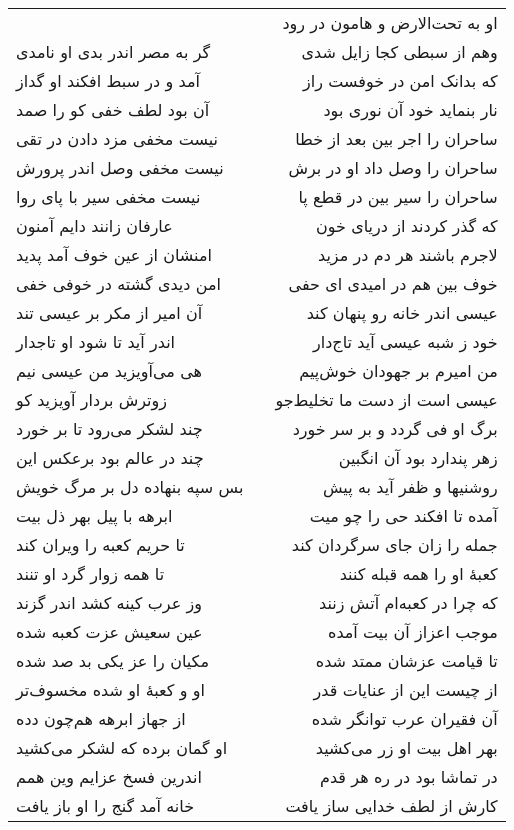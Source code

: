 \begin{center}
\begin{longtable}{l p{0.5cm} r}
&&
او به تحت‌الارض و هامون در رود
\\
گر به مصر اندر بدی او نامدی
&&
وهم از سبطی کجا زایل شدی
\\
آمد و در سبط افکند او گداز
&&
که بدانک امن در خوفست راز
\\
آن بود لطف خفی کو را صمد
&&
نار بنماید خود آن نوری بود
\\
نیست مخفی مزد دادن در تقی
&&
ساحران را اجر بین بعد از خطا
\\
نیست مخفی وصل اندر پرورش
&&
ساحران را وصل داد او در برش
\\
نیست مخفی سیر با پای روا
&&
ساحران را سیر بین در قطع پا
\\
عارفان زانند دایم آمنون
&&
که گذر کردند از دریای خون
\\
امنشان از عین خوف آمد پدید
&&
لاجرم باشند هر دم در مزید
\\
امن دیدی گشته در خوفی خفی
&&
خوف بین هم در امیدی ای حفی
\\
آن امیر از مکر بر عیسی تند
&&
عیسی اندر خانه رو پنهان کند
\\
اندر آید تا شود او تاجدار
&&
خود ز شبه عیسی آید تاج‌دار
\\
هی می‌آویزید من عیسی نیم
&&
من امیرم بر جهودان خوش‌پیم
\\
زوترش بردار آویزید کو
&&
عیسی است از دست ما تخلیط‌جو
\\
چند لشکر می‌رود تا بر خورد
&&
برگ او فی گردد و بر سر خورد
\\
چند در عالم بود برعکس این
&&
زهر پندارد بود آن انگبین
\\
بس سپه بنهاده دل بر مرگ خویش
&&
روشنیها و ظفر آید به پیش
\\
ابرهه با پیل بهر ذل بیت
&&
آمده تا افکند حی را چو میت
\\
تا حریم کعبه را ویران کند
&&
جمله را زان جای سرگردان کند
\\
تا همه زوار گرد او تنند
&&
کعبهٔ او را همه قبله کنند
\\
وز عرب کینه کشد اندر گزند
&&
که چرا در کعبه‌ام آتش زنند
\\
عین سعیش عزت کعبه شده
&&
موجب اعزاز آن بیت آمده
\\
مکیان را عز یکی بد صد شده
&&
تا قیامت عزشان ممتد شده
\\
او و کعبهٔ او شده مخسوف‌تر
&&
از چیست این از عنایات قدر
\\
از جهاز ابرهه هم‌چون دده
&&
آن فقیران عرب توانگر شده
\\
او گمان برده که لشکر می‌کشید
&&
بهر اهل بیت او زر می‌کشید
\\
اندرین فسخ عزایم وین همم
&&
در تماشا بود در ره هر قدم
\\
خانه آمد گنج را او باز یافت
&&
کارش از لطف خدایی ساز یافت
\\
\end{longtable}
\end{center}

